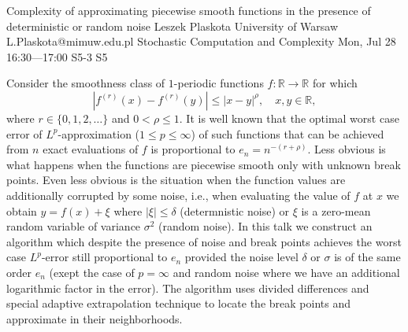 \begin{talk}
  {Complexity of approximating piecewise smooth functions in the presence of deterministic or random noise}%
  {Leszek Plaskota}%
  {University of Warsaw}%
  {L.Plaskota@mimuw.edu.pl}%
  {Stochastic Computation and Complexity}%
  {}%
  {Mon, Jul 28 16:30---17:00}%
  {S5-3}%
  {S5}%
    
   
Consider the smoothness class of $1$-periodic functions $f:\mathbb R\to\mathbb R$ for which 
$$|f^{(r)}(x)-f^{(r)}(y)|\le |x-y|^\rho,\quad x,y\in\mathbb R,$$ 
where $r\in\{0,1,2,\ldots\}$ and $0<\rho\le 1.$ It is well known that the optimal worst case error of $L^p$-approximation ($1\le p\le\infty$) of such functions that can be achieved from $n$ exact evaluations of $f$ is proportional to $e_n=n^{-(r+\rho)}.$ Less obvious is what happens when the functions are piecewise smooth only with unknown break points. Even less obvious is the situation when the function values are additionally corrupted by some noise, i.e., when evaluating the value of $f$ at $x$ we obtain $y=f(x)+\xi$ where $|\xi|\le\delta$ (determnistic noise) or $\xi$ is a zero-mean random variable of variance $\sigma^2$ (random noise). In this talk we construct an algorithm which despite the presence of noise and break points achieves the worst case $L^p$-error still proportional to $e_n$ provided the noise level $\delta$ or $\sigma$ is of the same order $e_n$ (exept the case of $p=\infty$ and random noise where we have an additional logarithmic factor in the error). The algorithm uses divided differences and special adaptive extrapolation technique to locate the break points and approximate in their neighborhoods. 

\end{talk}

